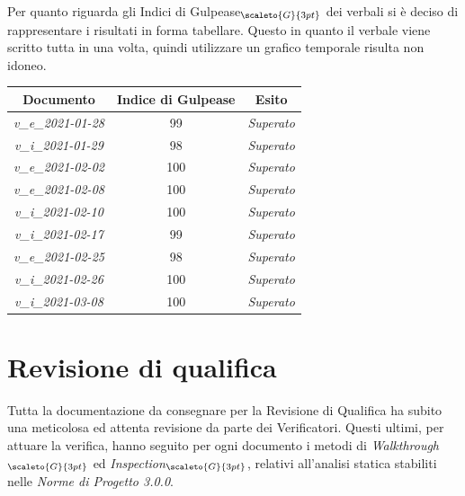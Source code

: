 {{{%

Per quanto riguarda gli Indici di Gulpease$_{\scaleto{G}{3pt}}$ dei verbali si è deciso di rappresentare i risultati in forma tabellare.
Questo in quanto il verbale viene scritto tutta in una volta, quindi utilizzare un grafico temporale risulta non idoneo.
\quad
\def\tabularxcolumn#1{m{#1}}
{
	\begin{center}
		\renewcommand{\arraystretch}{1.4}
		\begin{tabularx}{9.5cm}{|c|c|c|}
			\hline
			\rowcolor{airforceblue}
			\textbf{Documento} & \textbf{Indice di Gulpease} & \textbf{Esito}\\
			\hline
			\textit{v\_e\_2021-01-28} & 99 & \textit{Superato}\\
			\hline
			\textit{v\_i\_2021-01-29} & 98  & \textit{Superato}\\
			\hline
			\textit{v\_e\_2021-02-02} & 100 & \textit{Superato}\\
			\hline
			\textit{v\_e\_2021-02-08} & 100 & \textit{Superato}\\
			\hline
			\textit{v\_i\_2021-02-10} & 100 & \textit{Superato}\\
			\hline
			\textit{v\_i\_2021-02-17} & 99 & \textit{Superato}\\
			\hline
			\textit{v\_e\_2021-02-25} & 98 & \textit{Superato}\\
			\hline
			\textit{v\_i\_2021-02-26} & 100 & \textit{Superato}\\
			\hline

			\textit{v\_i\_2021-03-08} & 100 & \textit{Superato}\\
			\hline
		\end{tabularx}
	\end{center}

\section{Revisione di qualifica}\label{ResocontoAttivitàDiVerificaRevisioneDiQualifica}
Tutta la documentazione da consegnare per la Revisione di Qualifica ha subito una meticolosa ed attenta revisione da parte dei Verificatori. Questi ultimi, per attuare la verifica, hanno seguito per ogni documento i metodi di \textit{Walkthrough}$_{\scaleto{G}{3pt}}$ ed \textit{Inspection}$_{\scaleto{G}{3pt}}$, relativi all'analisi statica stabiliti nelle \textit{Norme di Progetto 3.0.0}.

}}}}
